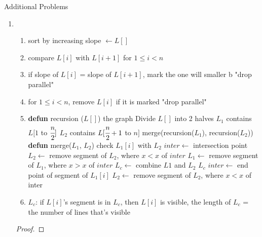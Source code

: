 \documentclass[paper=a4, fontsize=11pt]{scrartcl} %
\makeatletter
\numberwithin{equation}{section} %
\numberwithin{figure}{section} %
\numberwithin{table}{section} %
\renewcommand{\section}{\@startsection{section}{1}{0mm}
  {-\baselineskip}{0.5 \baselineskip}{\bf\leftline}}
\newenvironment{myproof}{\begin{proof}\setlength{\parindent}{2em}}{\end{proof}}
\makeatother
\begin{document}
\section{Additional Problems}
\begin{enumerate}
\item %
\begin{enumerate}
\item sort by increasing slope $\leftarrow L[]$
\item compare $L[i]$ with $L[i+1]$ for $1\leq i < n$
\item if slope of $L[i]$ = slope of $L[i+1]$, mark the one will smaller b "drop parallel"
\item for $1\leq i < n$, remove $L[i]$ if it is marked "drop parallel"
\item 
\begin{algorithmic}
\STATE \textbf{defun} recursion ($L[]$)
	\RETURN the graph
\ENDIF
\STATE Divide $L[]$ into 2 halves
\STATE $L_1$ contains $L[1$ to $\cfrac{n}{2}]$
\STATE $L_2$ contains $L[\cfrac{n}{2} + 1$ to $n]$
\RETURN  merge(recursion($L_1$), recursion($L_2$))
\STATE
\STATE \textbf{defun} merge($L_1$, $L_2$)
	\STATE check $L_1[i]$ with $L_2$
		\STATE $inter \leftarrow$ intersection point
		\STATE $L_2 \leftarrow$ remove segment of $L_2$, where $x < x$ of $inter$ 
		\STATE $L_1\leftarrow$ remove segment of $L_1$, where $x > x$ of $inter$
		\STATE $L_c\leftarrow$ combine $L1$ and $L_2$
		\RETURN $L_c$
	\ELSE
		\STATE $inter \leftarrow$ end point of segment of $L_1[i]$
		\STATE $L_2\leftarrow$ remove segment of $L_2$, where $x < x$ of inter
	\ENDIF
\ENDFOR
\end{algorithmic}
\item $L_c$: if $L[i]$'s segment is in $L_c$, then $L[i]$ is visible, the length of $L_c$ = the number of lines that's visible
\end{enumerate}
\begin{myproof}

\end{myproof}
\end{enumerate}
\end{document}
